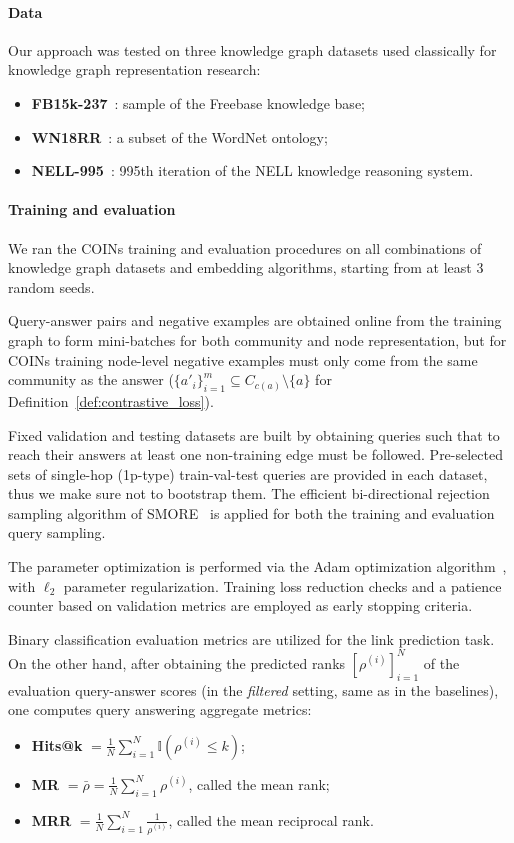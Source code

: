 \paragraph{Data}

Our approach was tested on three knowledge graph datasets used classically for knowledge graph representation research:
\begin{itemize}
    \item \textbf{FB15k-237}~\cite{toutanova_observed_2015}: sample of the Freebase knowledge base;
    \item \textbf{WN18RR}~\cite{dettmers_convolutional_2018}: a subset of the WordNet ontology;
    \item \textbf{NELL-995}~\cite{xiong_deeppath_2017}: 995th iteration of the NELL knowledge reasoning system.
\end{itemize}

\paragraph{Training and evaluation}
We ran the COINs training and evaluation procedures on all combinations of knowledge graph datasets and embedding algorithms, starting from at least 3 random seeds. 

Query-answer pairs and negative examples are obtained online from the training graph to form mini-batches for both community and node representation, but for COINs training node-level negative examples must only come from the same community as the answer ($\{a'_i\}_{i=1}^m \subseteq C_{c(a)}\setminus\{a\}$ for Definition~\ref{def:contrastive_loss}). 

Fixed validation and testing datasets are built by obtaining queries such that to reach their answers at least one non-training edge must be followed. Pre-selected sets of single-hop (1p-type) train-val-test queries are provided in each dataset, thus we make sure not to bootstrap them. The efficient bi-directional rejection sampling algorithm of SMORE~\cite{ren_smore_2021} is applied for both the training and evaluation query sampling. 

The parameter optimization is performed via the Adam optimization algorithm~\cite{kingma_adam_2015}, with $\ell_2$ parameter regularization. Training loss reduction checks and a patience counter based on validation metrics are employed as early stopping criteria.

Binary classification evaluation metrics are utilized for the link prediction task. On the other hand, after obtaining the predicted ranks $[\rho^{(i)}]_{i=1}^{N}$ of the evaluation query-answer scores (in the \emph{filtered} setting, same as in the baselines), one computes query answering aggregate metrics:
\begin{itemize}
    \item \textbf{Hits@k} $= \frac{1}{N}\sum_{i=1}^{N}{\mathbb{I}(\rho^{(i)} \leq k)}$;
    \item \textbf{MR} $= \bar{\rho} = \frac{1}{N}\sum_{i=1}^{N}{\rho^{(i)}}$, called the mean rank;
    \item \textbf{MRR} $= \frac{1}{N}\sum_{i=1}^{N}{\frac{1}{\rho^{(i)}}}$, called the mean reciprocal rank.
\end{itemize}

